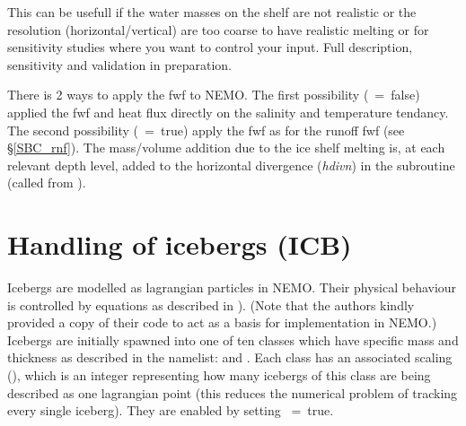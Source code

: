  This can be usefull if the water masses on the shelf are not realistic or the resolution (horizontal/vertical) are too 
coarse to have realistic melting or for sensitivity studies where you want to control your input. 
Full description, sensitivity and validation in preparation. 

There is 2 ways to apply the fwf to NEMO. The first possibility (~=~false) applied the fwf
 and heat flux directly on the salinity and temperature tendancy. The second possibility (~=~true)
 apply the fwf as for the runoff fwf (see \S\ref{SBC_rnf}). The mass/volume addition due to the ice shelf melting is,
 at each relevant depth level, added to the horizontal divergence (\textit{hdivn}) in the subroutine  
(called from ). 
%
\section{ Handling of icebergs (ICB) }
\label{ICB_icebergs}

Icebergs are modelled as lagrangian particles in NEMO.
Their physical behaviour is controlled by equations as described in  \citet{Martin_Adcroft_OM10} ).
(Note that the authors kindly provided a copy of their code to act as a basis for implementation in NEMO.)
Icebergs are initially spawned into one of ten classes which have specific mass and thickness as described in the  namelist: 
 and .
Each class has an associated scaling (), which is an integer representing how many icebergs 
of this class are being described as one lagrangian point (this reduces the numerical problem of tracking every single iceberg).
They are enabled by setting ~=~true.

